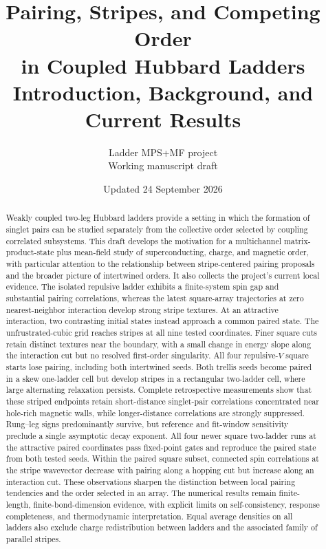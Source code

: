 \documentclass[11pt,letterpaper]{article}
\title{Pairing, Stripes, and Competing Order\\in Coupled Hubbard Ladders\\
  \large Introduction, Background, and Current Results}
\author{Ladder MPS+MF project\\Working manuscript draft}
\date{Updated 24 September 2026}
\begin{document}
\maketitle

\begin{abstract}
Weakly coupled two-leg Hubbard ladders provide a setting in which the formation
of singlet pairs can be studied separately from the collective order selected
by coupling correlated subsystems. This draft develops the motivation for a
multichannel matrix-product-state plus mean-field study of superconducting,
charge, and magnetic order, with particular attention to the relationship
between stripe-centered pairing proposals and the broader picture of
intertwined orders. It also collects the project's current local evidence.
The isolated repulsive ladder exhibits a finite-system spin gap and substantial
pairing correlations, whereas the latest square-array trajectories at zero
nearest-neighbor interaction develop strong stripe textures. At an attractive
interaction, two contrasting initial states instead approach a common paired
state. The unfrustrated-cubic grid reaches stripes at all
nine tested coordinates. Finer square cuts retain distinct textures near
the boundary, with a small change in energy slope along the interaction cut
but no resolved first-order singularity. All four repulsive-$V$ square
starts lose pairing, including both intertwined seeds. Both trellis seeds
become paired in a skew one-ladder cell but develop stripes in a rectangular
two-ladder cell, where large alternating relaxation persists. Complete
retrospective measurements show that these striped endpoints retain
short-distance singlet-pair correlations concentrated near hole-rich magnetic
walls, while longer-distance correlations are strongly suppressed.
Rung--leg signs predominantly survive, but reference and fit-window
sensitivity preclude a single asymptotic decay exponent. All four newer
square two-ladder runs at the attractive paired coordinates pass fixed-point
gates and reproduce the paired state from both tested seeds. Within the
paired square subset, connected spin correlations at the stripe wavevector decrease
with pairing along a hopping cut but increase along an interaction cut.
These observations sharpen the distinction between local pairing
tendencies and the order selected in an array. The numerical results remain
finite-length, finite-bond-dimension evidence, with explicit limits on
self-consistency, response completeness, and thermodynamic interpretation.
Equal average densities on all ladders also exclude charge redistribution
between ladders and the associated family of parallel stripes.
\end{abstract}
\end{document}
